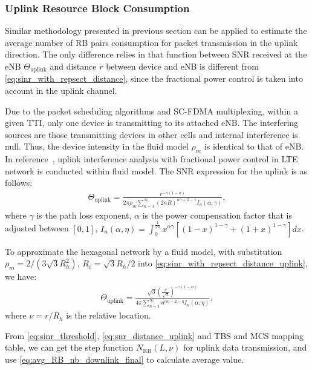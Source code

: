 \subsubsection{Uplink Resource Block Consumption}
Similar methodology presented in previous section can be applied to estimate the average number of RB pairs consumption for packet transmission in the uplink direction. The only difference relies in that function between SNR received at the eNB $\Theta_{\text{uplink}} $ and distance $r$ between device and eNB is different from \eqref{eq:sinr_with_repsect_distance}, since the fractional power control is taken into account in the uplink channel.

Due to the packet scheduling algorithms and SC-FDMA multiplexing, within a given TTI, only one device is transmitting to its attached eNB. The interfering sources are those transmitting devices in other cells and internal interference is null. Thus, the device intensity in the fluid model $\rho_{m} $ is identical to that of eNB. In reference~\cite{coupechoux2011set}, uplink interference analysis with fractional power control in LTE network is conducted within fluid model. The SNR expression for the uplink is as follows:
\begin{align}
\label{eq:sinr_with_repsect_distance_uplink}
\Theta_{\text{uplink}} = \frac{r^{-\gamma(1 - \alpha)}}{ 2 \pi \rho_{m} \sum_{n=1}^{\infty} (2nR)^{\alpha \gamma +2 - \gamma } I_{n}\left( \alpha, \gamma\right) },
\end{align}
where $\gamma$ is the path loss exponent, $\alpha$ is the power compensation factor that is adjusted between $\left[ 0, 1\right] $, $I_{n}\left( \alpha, \eta\right) = \int_{0}^{\frac{1}{2n}} x^{\alpha \gamma} \left[ (1-x)^{1-\gamma} +  (1 +x)^{1 - \gamma} \right] dx$. 

To approximate the hexagonal network by a fluid model, with substitution $\rho_{m} = 2/(3\sqrt{3} R_h^2)$, $R_c = \sqrt{3}R_h/2$ into \eqref{eq:sinr_with_repsect_distance_uplink}, we have:  
\begin{align}
	\label{eq:snr_distance_uplink}
	\Theta_{\text{uplink}} = \frac{\sqrt{3} (\frac{\nu}{\sqrt{3}})^{-\gamma(1 - \alpha)}}{ 4\pi \sum_{n=1}^{\infty} n^{\alpha \eta +2 - \eta} I_{n}\left( \alpha, \eta\right) },
\end{align}
where $\nu = r/ R_h$ is the relative location.

From \eqref{eq:sinr_threshold}, \eqref{eq:snr_distance_uplink} and TBS and MCS mapping table, we can get the step function $N_{\text{RB}}(L,\nu)$ for uplink data transmission, and use \eqref{eq:avg_RB_nb_downlink_final} to calculate average value. 


